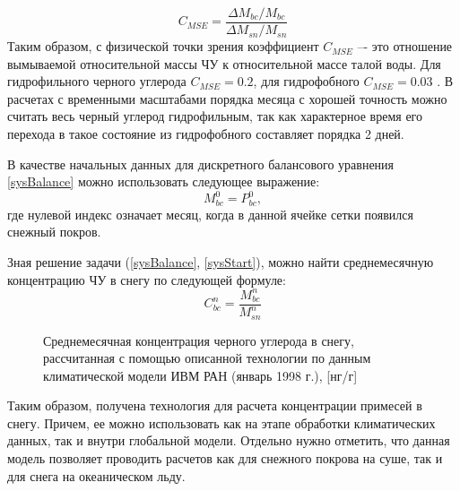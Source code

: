 \documentclass[a4paper, fontsize=14pt]{scrartcl}
\begin{document}
\begin{equation}
   C_{MSE} = \dfrac{\Delta M_{bc} / M_{bc}}{\Delta M_{sn} / M_{sn}}     \label{sys}
\end{equation}
Таким образом, с физической точки зрения коэффициент $C_{MSE}$ –- это отношение вымываемой относительной массы ЧУ к относительной
массе талой воды. Для гидрофильного черного углерода $C_{MSE} = 0.2$, для гидрофобного $C_{MSE} = 0.03$ \cite{Flanner2007, Conway1996}. В расчетах с временными масштабами порядка месяца с хорошей точность можно считать весь черный углерод гидрофильным, так как характерное время его перехода в такое состояние из гидрофобного составляет порядка 2 дней.

В качестве начальных данных для дискретного балансового уравнения \eqref{sysBalance} можно использовать следующее выражение:
\begin{equation}
    M_{bc}^0 = P_{bc}^0, \label{sysStart}
\end{equation}
где нулевой индекс означает месяц, когда в данной ячейке сетки появился снежный покров. 

Зная решение задачи (\eqref{sysBalance}, \eqref{sysStart}), можно найти среднемесячную концентрацию ЧУ в снегу по следующей формуле:
\begin{equation}
   C_{bc}^n = \dfrac{M_{bc}^n}{M_{sn}^n}  \label{sys}
\end{equation}

\begin{figure}[h]
    \caption{Среднемесячная концентрация черного углерода в снегу, рассчитанная с помощью описанной технологии по данным климатической модели ИВМ РАН (январь 1998 г.), [нг/г]}
    \label{fig:image}
\end{figure}

Таким образом, получена технология для расчета концентрации примесей в снегу. Причем, ее можно использовать как на этапе обработки климатических данных, так и внутри глобальной модели. Отдельно нужно отметить, что данная модель позволяет проводить расчетов как для снежного покрова на суше, так и для снега на океаническом льду.
\end{document}

